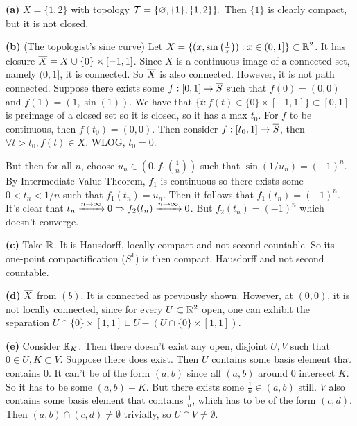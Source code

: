 \documentclass[a4paper, 10pt]{article}
\begin{document}
\begin{solution}
    \textbf{(a)} $X = \{1, 2\}$ with topology $\mathcal{T} = \{\varnothing, \{1\}, \{1, 2\}\}.$ Then $\{1\}$ is clearly compact, but it is not closed.

    \textbf{(b)} (The topologist's sine curve) Let $X = \{(x, \sin\left(\frac{1}{x}\right)) : x \in (0, 1]\} \subset \mathbb{R}^2$. It has closure $\overline{X} = X \cup \{0\} \times [-1, 1]$. Since $X$ is a continuous image of a connected set, namely $(0, 1]$, it is connected. So $\overline{X}$ is also connected. However, it is not path connected. Suppose there exists some $f: [0, 1] \to \overline{S}$ such that $f(0) = (0, 0)$ and $f(1) = (1, \sin(1))$. We have that $\{t : f(t) \in \{0\} \times [-1, 1]\} \subset [0, 1]$ is preimage of a closed set so it is closed, so it has a max $t_0$. For $f$ to be continuous, then $f(t_0) = (0, 0)$. Then consider $f: [t_0, 1] \to \overline{S}$, then $\forall t > t_0, f(t) \in X$. WLOG, $t_0 = 0$. 

    But then for all $n$, choose $u_n \in (0, f_1(\frac{1}{n}))$ such that $\sin(1/u_n) = (-1)^n$. By Intermediate Value Theorem, $f_1$ is continuous so there exists some $0 < t_n < 1/n$ such that $f_1(t_n) = u_n$. Then it follows that $f_1(t_n) = (-1)^n$. It's clear that $t_n \xrightarrow{n \to \infty} 0 \Rightarrow f_2(t_n) \xrightarrow{n \to \infty} 0$. But $f_2(t_n) = (-1)^n$ which doesn't converge. \contra

    \textbf{(c)} Take $\mathbb{R}$. It is Hausdorff, locally compact and not second countable. So its one-point compactification ($S^1$) is then compact, Hausdorff and not second countable.

    \textbf{(d)} $\overline{X}$ from $(b)$. It is connected as previously shown. However, at $(0, 0)$, it is not locally connected, since for every $U \subset \mathbb{R}^2$ open, one can exhibit the separation $U \cap \{0\} \times [1, 1] \sqcup U - (U \cap \{0\} \times [1, 1])$.

    \textbf{(e)} Consider $\mathbb{R}_K$. Then there doesn't exist any open, disjoint $U, V$ such that $0 \in U, K \subset V$. Suppose there does exist. Then $U$ contains some basis element that contains $0$. It can't be of the form $(a, b)$ since all $(a, b)$ around 0 intersect $K$. So it has to be some $(a, b) - K$. But there exists some $\frac{1}{n} \in (a, b)$ still. $V$ also contains some basis element that contains $\frac{1}{n}$, which has to be of the form $(c, d)$. Then $(a, b) \cap  (c,d) \neq \emptyset$ trivially, so $U \cap V \neq \emptyset$.
\end{solution}
\end{document}

